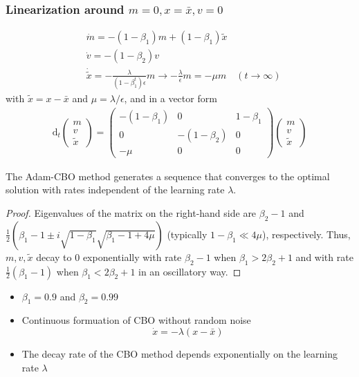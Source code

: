\documentclass{beamer}
\begin{document}
\begin{frame}
\frametitle{Linearization around $m = 0, x = \bar{x}, v = 0 $}
	\begin{align*}	
	&\dot m = -(1-\beta_1) m + (1-\beta_1) \tilde{x}\\
	&\dot v = -(1-\beta_2)v \\
	&\dot {\tilde{x}} = -\frac{\lambda }{(1-\beta_1^t)\epsilon}m \rightarrow -\frac{\lambda}{\epsilon} m = -\mu m  \quad (t \rightarrow \infty)
	\end{align*}
	with $\tilde{x} = x - \bar{x}$ and $\mu=\lambda/\epsilon$, and in a vector form
	\begin{equation*}
	\begin{aligned}
	\mathrm{d}_t	\left(\begin{matrix}
			m \\ v \\ \tilde x
		\end{matrix}\right) = 
	\left(\begin{matrix}
		-(1-\beta_1) & 0 & 1-\beta_1\\ 
		0 &  -(1-\beta_2) & 0  \\
		 -\mu & 0 & 0  
	\end{matrix}\right) 
	\left(\begin{matrix}
	m \\ v \\ \tilde x
	\end{matrix}\right)
	\end{aligned}
	\end{equation*}
\end{frame}

\begin{frame}
\begin{theorem}
	The Adam-CBO method generates a sequence that converges to the optimal solution with rates independent of the learning rate $\lambda$. 
	\begin{proof}
	Eigenvalues of the matrix on the right-hand side are $\beta_2-1$ and $\frac{1}{2}( \beta_1 - 1 \pm i  \sqrt{1-\beta_1}\sqrt{\beta_1-1+4\mu})$ (typically $1-\beta_1\ll 4\mu$), respectively. Thus, $m,v,\tilde{x}$ decay to $0$  exponentially with rate $\beta_2 -1 $ when $\beta_1>2\beta_2+1$ and with rate $\frac{1}{2}(\beta_1-1)$ when $\beta_1 < 2 \beta_2 + 1$ in an oscillatory way. 
	\end{proof}
\end{theorem} 	

\begin{itemize}
	\item $\beta_1 = 0.9$ and $\beta_2 = 0.99$
	\item Continuous formuation of CBO without random noise
	\begin{equation*}
	\dot x = - \lambda (x- \bar{x})
	\end{equation*}
	\item The decay rate of the CBO method depends exponentially on the learning rate $\lambda$
\end{itemize}

\end{frame}
\end{document}
